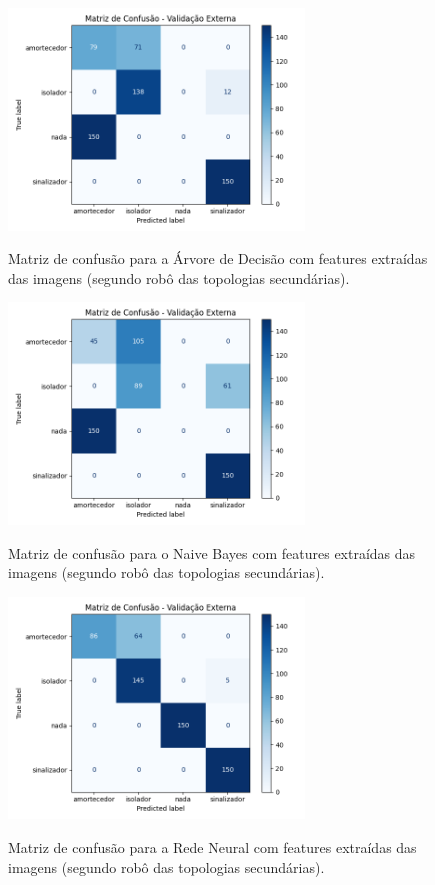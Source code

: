 \begin{figure}[H]
\centering
\caption{Matriz de confusão para a Árvore de Decisão com features extraídas das imagens (segundo robô das topologias secundárias).}
\includegraphics[width=0.7\textwidth]{figuras/Resultados/multi_segundo_Teste3_tree.png}
\label{fig:mc_featimg_tree_robo2_t3}
\fonte{}
\end{figure}

\begin{figure}[H]
\centering
\caption{Matriz de confusão para o Naive Bayes com features extraídas das imagens (segundo robô das topologias secundárias).}
\includegraphics[width=0.7\textwidth]{figuras/Resultados/multi_segundo_Teste3_naive.png}
\label{fig:mc_featimg_naive_robo2_t3}
\fonte{}
\end{figure}

\begin{figure}[H]
\centering
\caption{Matriz de confusão para a Rede Neural com features extraídas das imagens (segundo robô das topologias secundárias).}
\includegraphics[width=0.7\textwidth]{figuras/Resultados/multi_segundo_Teste3_nn.png}
\label{fig:mc_featimg_nn_robo2_t3}
\fonte{}
\end{figure}

